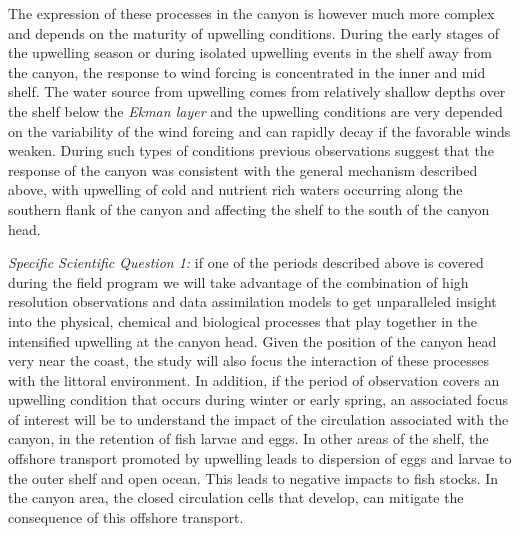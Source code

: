 The expression of these processes in the \naz canyon is however much
more complex and depends on the maturity of upwelling
conditions. During the early stages of the upwelling season or during
isolated upwelling events in the shelf away from the canyon, the
response to wind forcing is concentrated in the inner and mid
shelf. The water source from upwelling comes from relatively shallow
depths over the shelf below the \emph{Ekman layer} and the upwelling
conditions are very depended on the variability of the wind forcing
and can rapidly decay if the favorable winds weaken.  During such
types of conditions previous observations suggest that the response of
the \naz canyon was consistent with the general mechanism described
above, with upwelling of cold and nutrient rich waters occurring along
the southern flank of the canyon and affecting the shelf to the south
of the canyon head.
 
\textsl{Specific Scientific Question 1:} if one of the periods
described above is covered during the \proj field program we will take
advantage of the combination of high resolution observations and data
assimilation models to get unparalleled insight into the physical,
chemical and biological processes that play together in the
intensified upwelling at the \naz canyon head. Given the position of
the canyon head very near the coast, the study will also focus the
interaction of these processes with the littoral environment. In
addition, if the period of observation covers an upwelling condition
that occurs during winter or early spring, an associated focus of
interest will be to understand the impact of the circulation
associated with the canyon, in the retention of fish larvae and
eggs. In other areas of the shelf, the offshore transport promoted by
upwelling leads to dispersion of eggs and larvae to the outer shelf
and open ocean. This leads to negative impacts to fish stocks. In the
canyon area, the closed circulation cells that develop, can mitigate
the consequence of this offshore transport.

